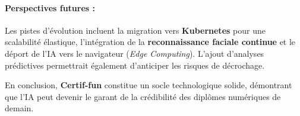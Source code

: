 \paragraph{Perspectives futures :} 
Les pistes d'évolution incluent la migration vers \textbf{Kubernetes} pour une scalabilité élastique, l'intégration de la \textbf{reconnaissance faciale continue} et le déport de l'IA vers le navigateur (\textit{Edge Computing}). L'ajout d'analyses prédictives permettrait également d'anticiper les risques de décrochage.

En conclusion, \textbf{Certif-fun} constitue un socle technologique solide, démontrant que l'IA peut devenir le garant de la crédibilité des diplômes numériques de demain.
